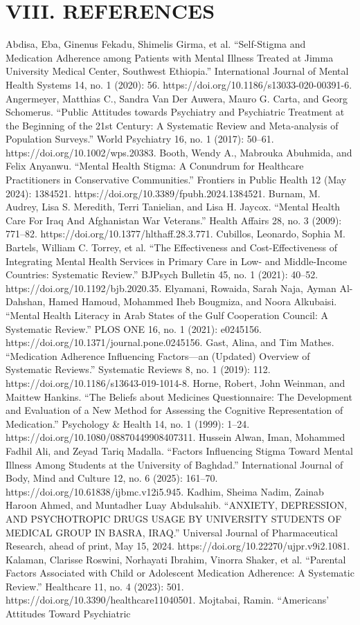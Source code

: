 \documentclass[12pt,a4paper]{article}
\begin{document}
\section*{VIII. REFERENCES}
Abdisa, Eba, Ginenus Fekadu, Shimelis Girma, et al. “Self-Stigma and Medication Adherence among Patients with Mental Illness Treated at Jimma University Medical Center, Southwest Ethiopia.” International Journal of Mental Health Systems 14, no. 1 (2020): 56. https://doi.org/10.1186/s13033-020-00391-6. Angermeyer, Matthias C., Sandra Van Der Auwera, Mauro G. Carta, and Georg Schomerus. “Public Attitudes towards Psychiatry and Psychiatric Treatment at the Beginning of the 21st Century: A Systematic Review and Meta‐analysis of Population Surveys.” World Psychiatry 16, no. 1 (2017): 50–61. https://doi.org/10.1002/wps.20383. Booth, Wendy A., Mabrouka Abuhmida, and Felix Anyanwu. “Mental Health Stigma: A Conundrum for Healthcare Practitioners in Conservative Communities.” Frontiers in Public Health 12 (May 2024): 1384521. https://doi.org/10.3389/fpubh.2024.1384521. Burnam, M. Audrey, Lisa S. Meredith, Terri Tanielian, and Lisa H. Jaycox. “Mental Health Care For Iraq And Afghanistan War Veterans.” Health Affairs 28, no. 3 (2009): 771–82. https://doi.org/10.1377/hlthaff.28.3.771. Cubillos, Leonardo, Sophia M. Bartels, William C. Torrey, et al. “The Effectiveness and Cost-Effectiveness of Integrating Mental Health Services in Primary Care in Low- and Middle-Income Countries: Systematic Review.” BJPsych Bulletin 45, no. 1 (2021): 40–52. https://doi.org/10.1192/bjb.2020.35. Elyamani, Rowaida, Sarah Naja, Ayman Al-Dahshan, Hamed Hamoud, Mohammed Iheb Bougmiza, and Noora Alkubaisi. “Mental Health Literacy in Arab States of the Gulf Cooperation Council: A Systematic Review.” PLOS ONE 16, no. 1 (2021): e0245156. https://doi.org/10.1371/journal.pone.0245156. Gast, Alina, and Tim Mathes. “Medication Adherence Influencing Factors—an (Updated) Overview of Systematic Reviews.” Systematic Reviews 8, no. 1 (2019): 112. https://doi.org/10.1186/s13643-019-1014-8. Horne, Robert, John Weinman, and Maittew Hankins. “The Beliefs about Medicines Questionnaire: The Development and Evaluation of a New Method for Assessing the Cognitive Representation of Medication.” Psychology \& Health 14, no. 1 (1999): 1–24. https://doi.org/10.1080/08870449908407311. Hussein Alwan, Iman, Mohammed Fadhil Ali, and Zeyad Tariq Madalla. “Factors Influencing Stigma Toward Mental Illness Among Students at the University of Baghdad.” International Journal of Body, Mind and Culture 12, no. 6 (2025): 161–70. https://doi.org/10.61838/ijbmc.v12i5.945. Kadhim, Sheima Nadim, Zainab Haroon Ahmed, and Muntadher Luay Abdulsahib. “ANXIETY, DEPRESSION, AND PSYCHOTROPIC DRUGS USAGE BY UNIVERSITY STUDENTS OF MEDICAL GROUP IN BASRA, IRAQ.” Universal Journal of Pharmaceutical Research, ahead of print, May 15, 2024. https://doi.org/10.22270/ujpr.v9i2.1081. Kalaman, Clarisse Roswini, Norhayati Ibrahim, Vinorra Shaker, et al. “Parental Factors Associated with Child or Adolescent Medication Adherence: A Systematic Review.” Healthcare 11, no. 4 (2023): 501. https://doi.org/10.3390/healthcare11040501. Mojtabai, Ramin. “Americans’ Attitudes Toward Psychiatric 
\end{document}
